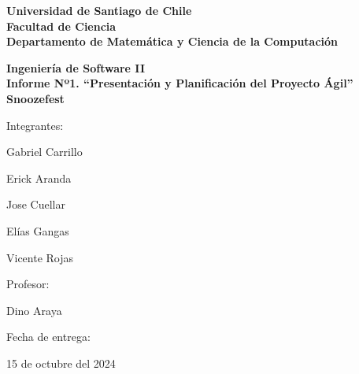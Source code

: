 \begin{titlepage}

\begin{center}
	{\bf Universidad de Santiago de Chile}
	\\
    {\bf Facultad de Ciencia}
	\\
    {\bf Departamento de Matem\'atica y Ciencia de la Computaci\'on}
\end{center}

%

\vfill
\begin{center}
{\large\bf Ingeniería de Software II}
\\
{\Large\bf Informe Nº1. “Presentación y Planificación del Proyecto Ágil”}\\
\vspace{1cm}
{\Huge\bf Snoozefest}
\end{center}
\vfill

%

\begin{flushright}
	\begin{minipage}{0.3\textwidth}
		Integrantes:
		\begin{simplelist}
			\item Gabriel Carrillo
			\item Erick Aranda
			\item Jose Cuellar
			\item Elías Gangas
			\item Vicente Rojas
		\end{simplelist}
	

		Profesor:
		\begin{simplelist}
			\item Dino Araya
		\end{simplelist}
	
		Fecha de entrega:
		\begin{simplelist}
			\item 15 de octubre del 2024
		\end{simplelist}
	\end{minipage}
\end{flushright}

\end{titlepage}
